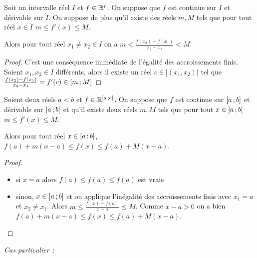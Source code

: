 \begin{theo}[IAF]\label{theo:iaf}
  Soit un intervalle réel \(I\) et \(f \in \mathbb{R}^I\). On suppose que \(f\) est continue sur \(I\) et dérivable sur \(\mathring{I}\). On suppose de plus qu'il existe des réels \(m,M\) tels que pour tout réel \(x \in \mathring{I}\) \(m \leqslant f'(x) \leqslant M\).

Alors pour tout réel \(x_1 \neq x_2 \in I\) on a \(m < \frac{f(x_2)-f(x_1)}{x_2-x_1} < M\).
\end{theo}
\begin{proof}
  C'est une conséquence immédiate de l'égalité des accroissements finis. Soient \(x_1, x_2 \in I\) différents, alors il existe un réel \(c \in ](x_1,x_2)[\) tel que \(\frac{f(x_2)-f(x_1)}{x_2-x_1} = f'(c) \in \left[ m \, ;  M \right]\)
\end{proof}

\begin{corth}
  Soient deux réels \(a < b\) et \(f \in \mathbb{R}^{\left[ a \, ;  b \right]}\). On suppose que \(f\) est continue sur \(\left[ a \, ;  b \right]\) et dérivable sur \(\left] a \, ;  b \right[\) et qu'il existe deux réels \(m,M\) tels que pour tout \(x \in \left] a \, ;  b \right[\) \(m \leqslant f'(x) \leqslant M\).

Alors pour tout réel \(x \in \left[ a \, ;  b \right]\), \(f(a)+m(x-a) \leqslant f(x) \leqslant f(a)+M(x-a)\).
\end{corth}\label{corth:iaf2}
\begin{proof}
  \begin{itemize}
  \item si \(x=a\) alors \(f(a) \leqslant f(a) \leqslant f(a)\) est vraie
  \item sinon, \(x \in \left] a \, ;  b \right]\) et on applique l'inégalité des accroissements finis avec \(x_1=a\) et \(x_2 \neq x_1\). Alors \(m \leqslant \frac{f(x)-f(a)}{x-a} \leqslant M\). Comme \(x-a >0\) on a bien \(f(a)+m(x-a) \leqslant f(x) \leqslant f(a)+M(x-a)\).
  \end{itemize}
\end{proof}

\emph{Cas particulier}~:

